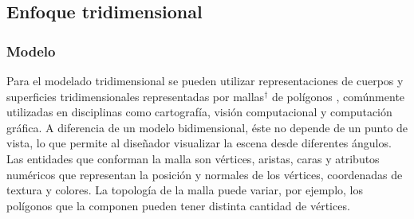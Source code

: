 \subsection{Enfoque tridimensional}
\subsubsection{Modelo}
Para el modelado tridimensional se pueden utilizar representaciones de cuerpos y superficies tridimensionales representadas por mallas$^\dagger$ de polígonos \cite{Mesh_building}, comúnmente utilizadas en disciplinas como cartografía, visión computacional y computación gráfica. A diferencia de un modelo bidimensional, éste no depende de un punto de vista, lo que permite al diseñador visualizar la escena desde diferentes ángulos. Las entidades que conforman la malla son vértices, aristas, caras y atributos numéricos que representan la posición y normales de los vértices, coordenadas de textura y colores. La topología de la malla puede variar, por ejemplo, los polígonos que la componen pueden tener distinta cantidad de vértices.

